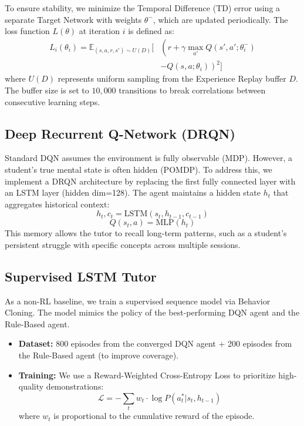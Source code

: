 \documentclass[conference]{IEEEtran}
\begin{document}
To ensure stability, we minimize the Temporal Difference (TD) error using a separate Target Network with weights $\theta^-$, which are updated periodically. The loss function $L(\theta)$ at iteration $i$ is defined as:
\begin{equation}
\begin{aligned}
L_i(\theta_i) = \mathbb{E}_{(s,a,r,s') \sim U(D)} \Big[
&\left( r + \gamma \max_{a'} Q(s', a'; \theta_i^-) \right. \\
&\left. - Q(s, a; \theta_i) \right)^2
\Big]
\end{aligned}
\end{equation}
where $U(D)$ represents uniform sampling from the Experience Replay buffer $D$. The buffer size is set to $10,000$ transitions to break correlations between consecutive learning steps.

\subsection{Deep Recurrent Q-Network (DRQN)}
Standard DQN assumes the environment is fully observable (MDP). However, a student's true mental state is often hidden (POMDP). To address this, we implement a DRQN architecture \cite{hausknecht2015} by replacing the first fully connected layer with an LSTM layer (hidden dim=128). The agent maintains a hidden state $h_t$ that aggregates historical context:
\begin{equation}
h_t, c_t = \text{LSTM}(s_t, h_{t-1}, c_{t-1})
\end{equation}
\begin{equation}
Q(s_t, a) = \text{MLP}(h_t)
\end{equation}
This memory allows the tutor to recall long-term patterns, such as a student's persistent struggle with specific concepts across multiple sessions.

\subsection{Supervised LSTM Tutor}
As a non-RL baseline, we train a supervised sequence model via Behavior Cloning. The model mimics the policy of the best-performing DQN agent and the Rule-Based agent.
\begin{itemize}
    \item \textbf{Dataset:} 800 episodes from the converged DQN agent + 200 episodes from the Rule-Based agent (to improve coverage).
    \item \textbf{Training:} We use a Reward-Weighted Cross-Entropy Loss to prioritize high-quality demonstrations:
    \begin{equation}
    \mathcal{L} = - \sum_{t} w_t \cdot \log P(a_t^* | s_t, h_{t-1})
    \end{equation}
    where $w_t$ is proportional to the cumulative reward of the episode.
\end{itemize}
\end{document}
